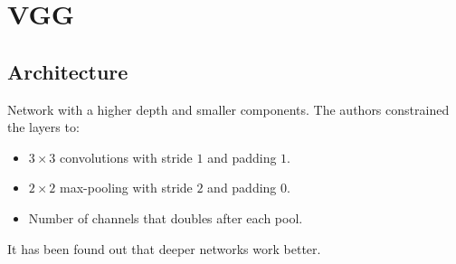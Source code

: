 \section{VGG}


\subsection{Architecture}

Network with a higher depth and smaller components.
The authors constrained the layers to:
\begin{itemize}
    \item $3 \times 3$ convolutions with stride $1$ and padding $1$.
    \item $2 \times 2$ max-pooling with stride $2$ and padding $0$.
    \item Number of channels that doubles after each pool.
\end{itemize}

\begin{remark}
    It has been found out that deeper networks work better.
\end{remark}

